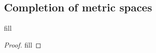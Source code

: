 \subsection{Completion of metric spaces}

\begin{exercise}{1}
fill
\end{exercise}
\begin{proof}
fill
\end{proof}